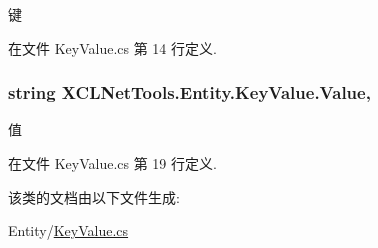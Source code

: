键 



在文件 Key\-Value.\-cs 第 14 行定义.

\hypertarget{class_x_c_l_net_tools_1_1_entity_1_1_key_value_a9ec3c76143930f64c1e0de2074514bae}{
\subsubsection[{Value}]{\setlength{\rightskip}{0pt plus 5cm}string X\-C\-L\-Net\-Tools.\-Entity.\-Key\-Value.\-Value\hspace{0.3cm}{\ttfamily [get]}, {\ttfamily [set]}}}\label{class_x_c_l_net_tools_1_1_entity_1_1_key_value_a9ec3c76143930f64c1e0de2074514bae}


值 



在文件 Key\-Value.\-cs 第 19 行定义.



该类的文档由以下文件生成\-:\begin{DoxyCompactItemize}
\item 
Entity/\hyperlink{_key_value_8cs}{Key\-Value.\-cs}\end{DoxyCompactItemize}
